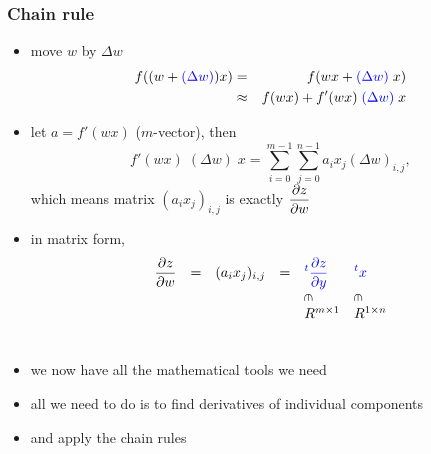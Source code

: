 \documentclass[12pt,dvipdfmx]{beamer}
\newcommand{\ao}[1]{{\color{blue}#1}}
\begin{document}
\begin{frame}
\frametitle{Chain rule}
\begin{itemize}
\item move $w$ by $\Delta w$ 
  \begin{eqnarray*}
f((w + \ao{(\Delta w)}) x)
& =       & f(wx  + \ao{(\Delta w)}\;x) \\
& \approx & f(wx) + f'(wx)\; \ao{(\Delta w)}\; x \\
  \end{eqnarray*}

\item let $a = f'(wx)$ ($m$-vector), then
\[ f'(wx) \; (\Delta w)\; x = \sum_{i=0}^{m-1} \sum_{j=0}^{n-1} a_i x_j (\Delta w)_{i,j}, \]
which means matrix $\left(a_i x_j\right)_{i,j}$ is exactly ${\displaystyle \frac{\partial z}{\partial w}}$

\item in matrix form, 
\[
  \begin{array}{rclcll}
{\displaystyle\pp{z}{w}} & = & (a_i x_j)_{i,j} & = & 
{\displaystyle\ao{{}^t\pp{z}{y}}} & {\displaystyle\ao{{}^tx}} \\
          &   &                &   & \rin               & \rin \\
          &   &                &   & R^{m\times 1}        & R^{1\times n} \\
  \end{array}
  \]

\end{itemize}
\end{frame}

\begin{frame}
\frametitle{}

\begin{columns}[t]
\begin{column}{0.6\textwidth}
  \begin{itemize}
  \item we now have all the mathematical tools we need
  \item all we need to do is to find derivatives of 
    individual components
  \item and apply the chain rules
  \end{itemize}
\end{column}

\begin{column}{0.4\textwidth}
\begin{center}
\def\svgwidth{0.6\textwidth}
{\scriptsize}
\end{center}
\end{column}  
\end{columns}
\end{frame}
\fi
\end{document}
